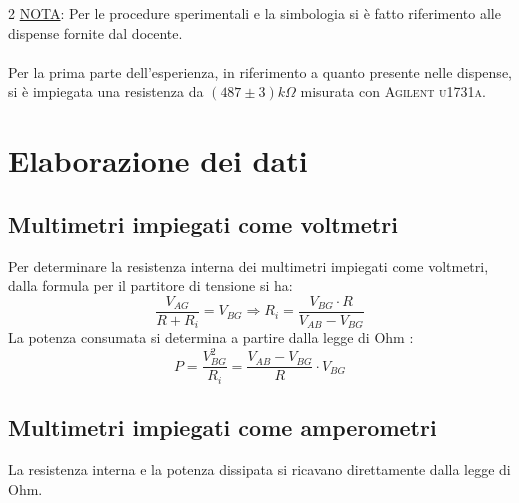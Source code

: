 \documentclass{article}
\begin{document}
\begin{multicols}{2}
\noindent
\underline{NOTA}: Per le procedure sperimentali e la simbologia si è fatto riferimento alle dispense fornite dal docente.\\
\\
Per la prima parte dell'esperienza, in riferimento a quanto presente nelle dispense, si è impiegata una resistenza da \((487\pm3)k\Omega\) misurata con \textsc{Agilent u1731a}.  
\section{Elaborazione dei dati}
\subsection{Multimetri impiegati come voltmetri}
Per determinare la resistenza interna dei multimetri impiegati come voltmetri, dalla formula per il partitore di tensione \cite{boyestad} si ha: 
\begin{equation}
    \frac{V_{AG}}{R+R_i}=V_{BG} \Rightarrow R_i=\frac{V_{BG}\cdot R}{V_{AB}-V_{BG}}
\end{equation}
La potenza consumata si determina a partire dalla legge di Ohm \cite{boylestad}:
\begin{equation}
    P=\frac{V_{BG}^2}{R_i}=\frac{V_{AB}-V_{BG}}{R}\cdot V_{BG}
\end{equation}
\subsection{Multimetri impiegati come amperometri}
La resistenza interna e la potenza dissipata si ricavano direttamente dalla legge di Ohm.

\end{multicols}
\end{document}
